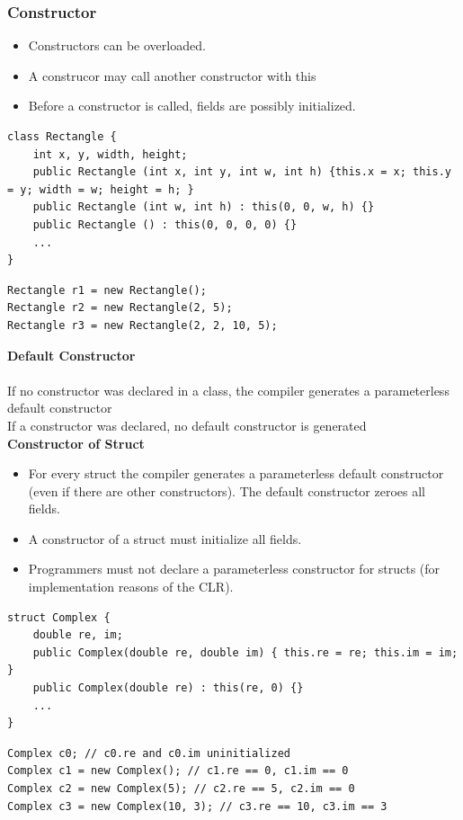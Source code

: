 \subsubsection{Constructor}
\begin{itemize}
	\item Constructors can be overloaded.
	\item A construcor may call another constructor with this
	\item Before a constructor is called, fields are possibly initialized.
\end{itemize}

\begin{multicols}{2}
\begin{lstlisting}
class Rectangle {
	int x, y, width, height;
	public Rectangle (int x, int y, int w, int h) {this.x = x; this.y = y; width = w; height = h; }
	public Rectangle (int w, int h) : this(0, 0, w, h) {}
	public Rectangle () : this(0, 0, 0, 0) {}
	...
}
\end{lstlisting}
\columnbreak
\begin{lstlisting}
Rectangle r1 = new Rectangle();
Rectangle r2 = new Rectangle(2, 5);
Rectangle r3 = new Rectangle(2, 2, 10, 5);
\end{lstlisting}
\end{multicols}

\textbf{Default Constructor}\\ \\
If no constructor was declared in a class, the compiler generates a parameterless default constructor\\
If a constructor was declared, no default constructor is generated\\ 


\textbf{Constructor of Struct}
\begin{itemize}
	\item For every struct the compiler generates a parameterless default constructor (even if there are other constructors).
		  The default constructor zeroes all fields.
	\item A constructor of a struct must initialize all fields.
	\item Programmers must not declare a parameterless constructor for structs (for implementation reasons of the CLR).
\end{itemize}

\begin{multicols}{2}
\begin{lstlisting}
struct Complex {
	double re, im;
	public Complex(double re, double im) { this.re = re; this.im = im; }
	public Complex(double re) : this(re, 0) {}
	...
}
\end{lstlisting}
\columnbreak
\begin{lstlisting}
Complex c0; // c0.re and c0.im uninitialized
Complex c1 = new Complex(); // c1.re == 0, c1.im == 0
Complex c2 = new Complex(5); // c2.re == 5, c2.im == 0
Complex c3 = new Complex(10, 3); // c3.re == 10, c3.im == 3
\end{lstlisting}
\end{multicols}


